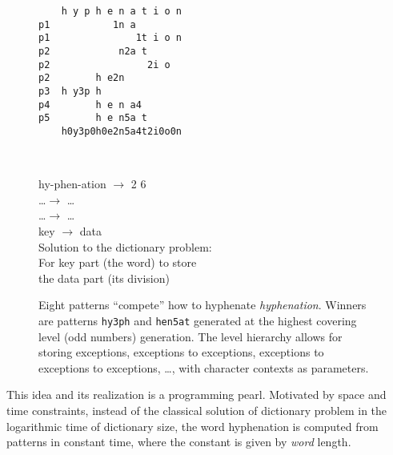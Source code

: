 \documentclass{csbulletin}
\let\stress=\emph
\newcommand{\word}[1]{\textit{#1}\xspace}
\newcommand{\patword}[1]{\texttt{#1}\xspace}
\begin{document}
\begin{figure}[tb]
\centering
\begin{minipage}[c]{.46\textwidth}
\begin{verbatim}
    h y p h e n a t i o n
p1           1n a
p1               1t i o n
p2            n2a t
p2                 2i o
p2        h e2n
p3  h y3p h
p4        h e n a4
p5        h e n5a t
    h0y3p0h0e2n5a4t2i0o0n
\end{verbatim}
\end{minipage}%
~
\begin{minipage}[c]{.45\textwidth}
hy-phen-ation $\rightarrow$ 2 6\\
\ldots $\rightarrow$ \ldots \\
\ldots $\rightarrow$ \ldots \\
key $\rightarrow$ data\\[2mm]
Solution to the dictionary problem:\\
For key part (the word) to store\\
the data part (its division)
\end{minipage}

\caption{Eight patterns ``compete'' how to hyphenate \word{hyphenation}. 
    Winners are patterns \patword{hy3ph} and \patword{hen5at} generated at the highest covering level (odd numbers) generation. 
    The level hierarchy allows for storing exceptions, exceptions to exceptions, exceptions to exceptions to exceptions, \ldots, with character contexts as parameters.~\protect\cite{tex:Liang83:thesis}
    }
    \label{fig:competingpatterns}
\end{figure}

This idea and its realization is a programming pearl.
Motivated by space and time constraints, instead of the classical solution of dictionary problem in the logarithmic time of dictionary size, the word hyphenation is computed from patterns in constant time, where the constant is given by \stress{word} length. 
%
\end{document}
